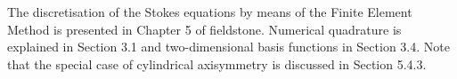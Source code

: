 The discretisation of the Stokes equations by means of the Finite Element Method
is presented in Chapter 5 of fieldstone. Numerical quadrature is explained in 
Section 3.1 and two-dimensional basis functions in Section 3.4.
Note that the special case of cylindrical axisymmetry is discussed in Section 5.4.3.
